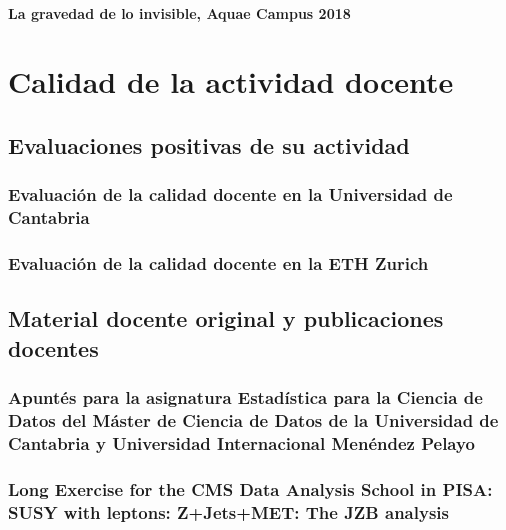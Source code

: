 \documentclass[a4paper, 11pt, twoside, openright]{report}
\begin{document}
\paragraph{La gravedad de lo invisible, Aquae Campus 2018} 


\section{Calidad de la actividad docente}

\subsection{Evaluaciones positivas de su actividad}

\subsubsection{Evaluación de la calidad docente en la Universidad de Cantabria}


\subsubsection{Evaluación de la calidad docente en la ETH Zurich}


\subsection{Material docente original y publicaciones docentes}

\subsubsection{Apuntés para la asignatura Estadística para la Ciencia de Datos del Máster de Ciencia de Datos de la Universidad de Cantabria y Universidad Internacional Menéndez Pelayo}


\subsubsection{Long Exercise for the CMS Data Analysis School in PISA: SUSY with leptons: Z+Jets+MET: The JZB analysis}

\end{document}
